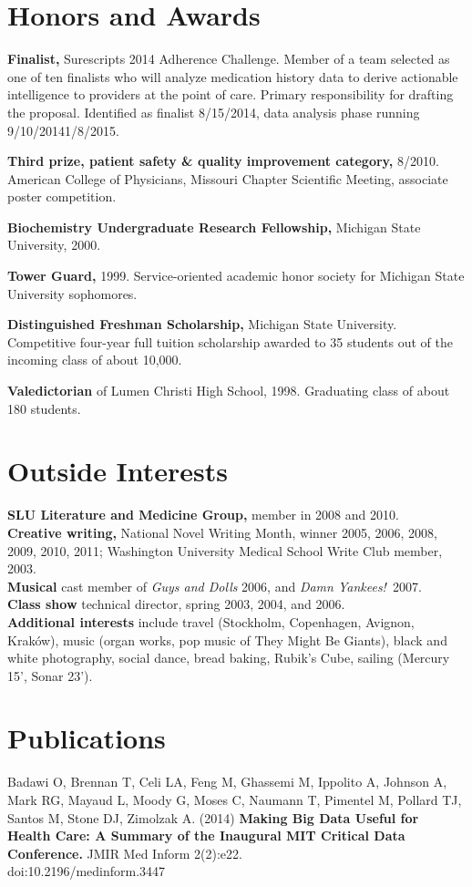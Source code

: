 \documentclass[12pt]{article}
\begin{document}
\section*{Honors and Awards}

\textbf{Finalist,} Surescripts 2014 Adherence Challenge. Member of a
team selected as one of ten finalists who will analyze medication
history data to derive actionable intelligence to providers at the
point of care. Primary responsibility for drafting the proposal.
Identified as finalist 8/15/2014, data analysis phase running
9/10/2014\ndash{}1/8/2015.

\textbf{Third prize, patient safety \& quality improvement category,} 8/2010.
American College of Physicians, Missouri Chapter Scientific Meeting,
associate poster competition.

\textbf{Biochemistry Undergraduate Research Fellowship,} Michigan State
University, 2000.

\textbf{Tower Guard,} 1999. Service-oriented academic honor
society for Michigan State University sophomores.

\textbf{Distinguished Freshman Scholarship,} Michigan State
University. Competitive four-year full tuition scholarship awarded to
35 students out of the incoming class of about 10,000.

\textbf{Valedictorian} of Lumen Christi High School, 1998. Graduating
class of about 180 students.

\section*{Outside Interests}

\textbf{SLU Literature and Medicine Group,} member in 2008 and 2010.\\
\textbf{Creative writing,} National Novel Writing Month, winner 2005, 2006,
2008, 2009, 2010, 2011; Washington University Medical School Write Club
member, 2003.\\
\textbf{Musical} cast member of \emph{Guys and Dolls} 2006, and
\emph{Damn Yankees!}\ 2007.\\
\textbf{Class show} technical director, spring 2003, 2004, and 2006.\\
\textbf{Additional interests} include travel (Stockholm, Copenhagen,
Avignon, Krak\'ow), music (organ works, pop music of They Might Be
Giants), black and white photography, social dance, bread baking,
Rubik's Cube, sailing (Mercury 15', Sonar 23').

\section*{Publications}
Badawi O, Brennan T, Celi LA, Feng M, Ghassemi M, Ippolito A, Johnson
A, Mark RG, Mayaud L, Moody G, Moses C, Naumann T, Pimentel M, Pollard
TJ, Santos M, Stone DJ, Zimolzak A. (2014) \textbf{Making Big Data
  Useful for Health Care: A Summary of the Inaugural MIT Critical Data
  Conference.} JMIR Med Inform 2(2):e22.\\
doi:10.2196/medinform.3447
\end{document}
